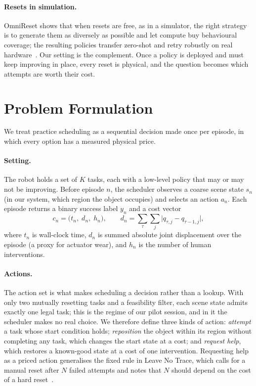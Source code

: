 \documentclass[runningheads]{llncs}
\begin{document}
\paragraph{Resets in simulation.}
OmniReset shows that when resets are free, as in a simulator, the right strategy is to generate them as diversely as possible and let compute buy behavioural coverage; the resulting policies transfer zero-shot and retry robustly on real hardware~\cite{yin2026}. Our setting is the complement. Once a policy is deployed and must keep improving in place, every reset is physical, and the question becomes which attempts are worth their cost.

\section{Problem Formulation}
\label{sec:problem}

We treat practice scheduling as a sequential decision made once per episode, in which every option has a measured physical price.

\paragraph{Setting.}
The robot holds a set of $K$ tasks, each with a low-level policy that may or may not be improving. Before episode $n$, the scheduler observes a coarse scene state $s_n$ (in our system, which region the object occupies) and selects an action $a_n$. Each episode returns a binary success label $y_n$ and a cost vector
\begin{equation}
  c_n = \bigl( t_n,\; d_n,\; h_n \bigr), \qquad
  d_n = \sum_{\tau} \sum_{j} \bigl| q_{\tau, j} - q_{\tau-1, j} \bigr|,
  \label{eq:cost}
\end{equation}
where $t_n$ is wall-clock time, $d_n$ is summed absolute joint displacement over the episode (a proxy for actuator wear), and $h_n$ is the number of human interventions.

\paragraph{Actions.}
The action set is what makes scheduling a decision rather than a lookup. With only two mutually resetting tasks and a feasibility filter, each scene state admits exactly one legal task; this is the regime of our pilot session, and in it the scheduler makes no real choice. We therefore define three kinds of action: \emph{attempt} a task whose start condition holds; \emph{reposition} the object within its region without completing any task, which changes the start state at a cost; and \emph{request help}, which restores a known-good state at a cost of one intervention. Requesting help as a priced action generalises the fixed rule in Leave No Trace, which calls for a manual reset after $N$ failed attempts and notes that $N$ should depend on the cost of a hard reset~\cite{eysenbach2018}.
\end{document}
